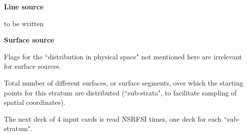 \medskip

\textcolor[rgb]{0.00,0.00,1.00}{{\bf  Line source}}

to be written

\medskip

\textcolor[rgb]{0.00,0.00,1.00}{{\bf  Surface source}}

Flags for the ``distribution in physical space" not mentioned here are
irrelevant for surface sources.

\begin{list}{ }{}
\item[{\bf NSRFSI }]
Total number of different surfaces, or surface segments, over which the starting points
for this stratum are distributed (``sub-strata", to facilitate sampling of spatial coordinates).
\end{list}
The next deck of 4 input cards is read NSRFSI times, one deck for each ``sub-stratum".
